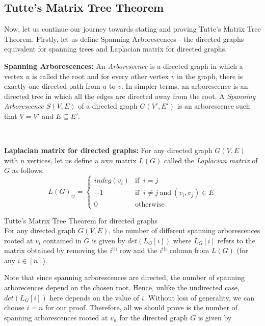 \subsection{Tutte’s Matrix Tree Theorem} \label{subsec:tutte's application}
 Now, let us continue our journey towards stating and proving Tutte's Matrix Tree Theorem. Firstly, let us define Spanning Arborescences - the directed graphs equivalent for spanning trees and Laplacian matrix for directed graphs.
\begin{definition}\textbf{Spanning Arborescences:} An \textit{Arborescence} is a directed graph in which a vertex $u$ is called the root and for every other vertex $v$ in the graph, there is exactly one directed path from $u$ to $v$. In simpler terms, an arborescence is an directed tree in which all the edges are directed away from the root. A \textit{Spanning Arborescence} $S(V,E)$ of a directed graph $G(V',E')$ is an arborescence such that $V=V'$ and $E\subseteq E'$.
\end{definition}
\noindent\\
\begin{definition}\textbf{Laplacian matrix for directed graphs:} For any directed graph $G(V,E)$ with $n$ vertices, let us define a $n$x$n$ matrix $L(G)$ called the \textit{Laplacian matrix} of $G$ as follows.
\[
  L(G)_{ij} = 
  \begin{cases}
    indeg(v_i) &\mbox{if }~ i = j\\
    -1 &\mbox{if }~ i \neq j ~\text{and}~(v_i,v_j)\in E\\
    0 &\mbox{otherwise}
  \end{cases}
\]
\end{definition}
\begin{theorem} Tutte's Matrix Tree Theorem for directed graphs\\
For any directed graph $G(V,E)$, the number of different spanning arborescences rooted at $v_i$ contained in $G$ is given by $det(L_G[i])$ where $L_G[i]$ refers to the matrix obtained by removing the $i^{\text{th}}$ row and the $i^{\text{th}}$ column from $L(G)$ (for any $i \in [n]$).
\end{theorem}
\noindent
Note that since spanning arborescences are directed, the number of spanning arborecences depend on the chosen root. Hence, unlike the undirected case, $det(L_G[i])$ here depends on the value of $i$. Without loss of generality, we can choose $i = n$ for our proof. Therefore, all we should prove is the number of spanning arborescences rooted at $v_n$ for the directed graph $G$ is given by
